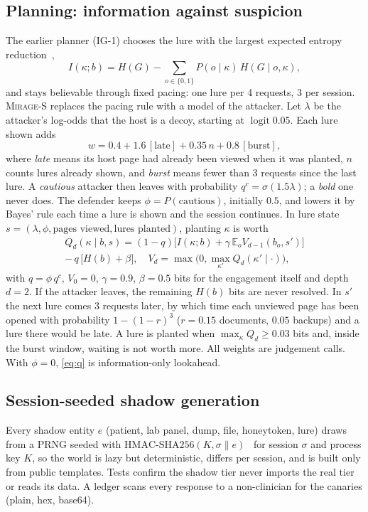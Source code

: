 \documentclass[conference,10pt]{IEEEtran}
\newcommand{\Mirage}{\textsc{Mirage}\xspace}
\begin{document}
\subsection{Planning: information against suspicion}
The earlier planner (IG-1) chooses the lure with the largest expected entropy
reduction~\cite{lindley1956measure},
\begin{equation}
I(\kappa;b)=H(G)-\sum_{o\in\{0,1\}}P(o\mid\kappa)\,H(G\mid o,\kappa),\label{eq:ig}
\end{equation}
and stays believable through fixed pacing: one lure per 4 requests, 3 per session. \Mirage-S
replaces the pacing rule with a model of the attacker. Let $\lambda$ be the attacker's log-odds
that the host is a decoy, starting at $\operatorname{logit}0.05$. Each lure shown adds
\begin{equation}
w=0.4+1.6\,[\text{late}]+0.35\,n+0.8\,[\text{burst}],\label{eq:susp}
\end{equation}
where \emph{late} means its host page had already been viewed when it was planted, $n$ counts lures
already shown, and \emph{burst} means fewer than 3 requests since the last lure. A \emph{cautious}
attacker then leaves with probability $q^{c}=\sigma(1.5\lambda)$; a \emph{bold} one never does. The
defender keeps $\phi=P(\text{cautious})$, initially $0.5$, and lowers it by Bayes' rule each time a
lure is shown and the session continues. In lure state $s=(\lambda,\phi,\text{pages viewed},
\text{lures planted})$, planting $\kappa$ is worth
\begin{multline}
Q_d(\kappa\mid b,s)=(1-q)\big[I(\kappa;b)+\gamma\,\mathbb{E}_o V_{d-1}(b_o,s')\big]\\
-\,q\,\big[H(b)+\beta\big],\quad V_d=\max\!\big(0,\max_{\kappa'}Q_d(\kappa'\mid\cdot)\big),\label{eq:q}
\end{multline}
with $q=\phi\,q^{c}$, $V_0=0$, $\gamma=0.9$, $\beta=0.5$ bits for the engagement itself and depth
$d=2$. If the attacker
leaves, the remaining $H(b)$ bits are never resolved. In $s'$ the next lure comes 3 requests
later, by which time each unviewed page has been opened with probability $1-(1-r)^3$ ($r=0.15$
documents, $0.05$ backups) and a lure there would be late. A lure is planted when
$\max_\kappa Q_d\ge0.03$ bits and, inside the burst window, waiting is not worth more. All weights
are judgement calls. With $\phi=0$, \eqref{eq:q} is information-only lookahead.

\subsection{Session-seeded shadow generation}
Every shadow entity $e$ (patient, lab panel, dump, file, honeytoken, lure) draws from a PRNG seeded
with $\mathrm{HMAC\text{-}SHA256}(K,\sigma\|e)$~\cite{rfc2104} for session $\sigma$ and process
key $K$, so the world is lazy but deterministic, differs per session, and is built only from
public templates. Tests confirm the shadow tier never imports the real tier or reads its data. A
ledger scans every response to a non-clinician for the canaries (plain, hex, base64).
\end{document}
